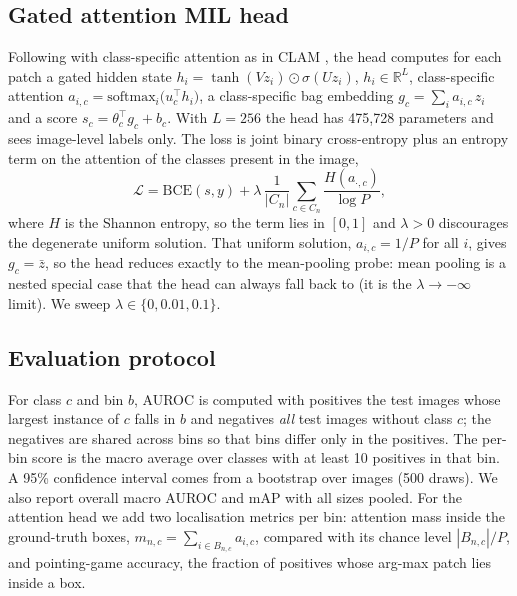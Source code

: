 \documentclass[10pt,letterpaper,twocolumn]{article}
\begin{document}
\subsection{Gated attention MIL head}
Following \citet{ilse2018attention} with class-specific attention as in CLAM
\citep{lu2021clam}, the head computes for each patch a gated hidden state
$h_i = \tanh(Vz_i)\odot\sigma(Uz_i)$, $h_i\in\mathbb{R}^{L}$, class-specific attention
$a_{i,c} = \mathrm{softmax}_i\big(u_c^{\top} h_i\big)$, a class-specific bag embedding
$g_c=\sum_i a_{i,c}\, z_i$ and a score $s_c = \theta_c^{\top} g_c + b_c$. With $L=256$ the
head has 475,728 parameters and sees image-level labels only. The loss is joint binary
cross-entropy plus an entropy term on the attention of the classes present in the image,
\begin{equation*}
\mathcal{L} = \mathrm{BCE}(s, y) + \lambda\,\frac{1}{|C_n|}\sum_{c\in C_n}\frac{H(a_{\cdot,c})}{\log P},
\end{equation*}
where $H$ is the Shannon entropy, so the term lies in $[0,1]$ and $\lambda>0$ discourages the
degenerate uniform solution. That uniform solution, $a_{i,c}=1/P$ for all $i$, gives
$g_c=\bar z$, so the head reduces exactly to the mean-pooling probe: mean pooling is a nested
special case that the head can always fall back to (it is the $\lambda\to-\infty$ limit). We
sweep $\lambda\in\{0, 0.01, 0.1\}$.

\subsection{Evaluation protocol}
For class $c$ and bin $b$, AUROC is computed with positives the test images whose largest
instance of $c$ falls in $b$ and negatives \emph{all} test images without class $c$; the
negatives are shared across bins so that bins differ only in the positives. The per-bin score
is the macro average over classes with at least 10 positives in that bin. A 95\% confidence
interval comes from a bootstrap over images (500 draws). We also report overall macro AUROC
and mAP with all sizes pooled. For the attention head we add two localisation metrics per bin:
attention mass inside the ground-truth boxes, $m_{n,c}=\sum_{i\in B_{n,c}} a_{i,c}$, compared
with its chance level $|B_{n,c}|/P$, and pointing-game accuracy, the fraction of positives
whose arg-max patch lies inside a box.
\end{document}
